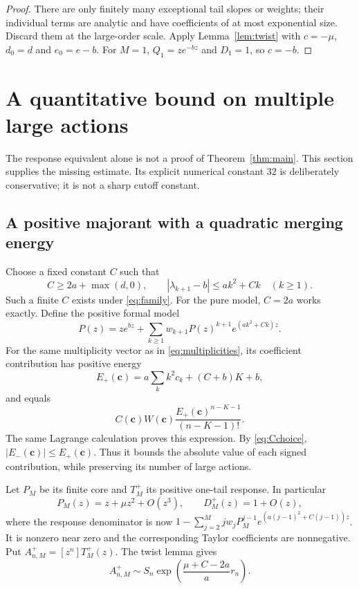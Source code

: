 \documentclass[11pt,a4paper]{article}
\numberwithin{equation}{section}
\theoremstyle{definition}
\theoremstyle{remark}
\begin{document}
\begin{proof}
There are only finitely many exceptional tail slopes or weights; their
individual terms are analytic and have coefficients of at most exponential
size. Discard them at the large-order scale. Apply
Lemma~\ref{lem:twist} with $c=-\mu$, $d_0=d$ and $e_0=e-b$.
For $M=1$, $Q_1=ze^{-bz}$ and $D_1=1$, so $c=-b$.
\end{proof}

\section{A quantitative bound on multiple large actions}
\label{sec:merging}

The response equivalent alone is not a proof of Theorem~\ref{thm:main}.
This section supplies the missing estimate. Its explicit numerical constant
$32$ is deliberately conservative; it is not a sharp cutoff constant.

\subsection{A positive majorant with a quadratic merging energy}

Choose a fixed constant $C$ such that
\begin{equation}
 C\ge 2a+\max(d,0),\qquad
 |\lambda_{k+1}-b|\le a k^2+Ck\quad(k\ge1).
 \label{eq:Cchoice}
\end{equation}
Such a finite $C$ exists under \eqref{eq:family}. For the pure model,
$C=2a$ works exactly. Define the positive formal model
\begin{equation}
 P(z)=ze^{bz}+\sum_{k\ge1}w_{k+1}P(z)^{k+1}e^{(a k^2+Ck)z}.
 \label{eq:majorant-model}
\end{equation}
For the same multiplicity vector as in \eqref{eq:multiplicities}, its
coefficient contribution has positive energy
\begin{equation}
 E_+(\mathbf c)=a\sum_k k^2c_k+(C+b)K+b,
 \label{eq:plus-energy}
\end{equation}
and equals
\begin{equation}
 C(\mathbf c)W(\mathbf c)
 \frac{E_+(\mathbf c)^{n-K-1}}{(n-K-1)!}.
 \label{eq:plus-term}
\end{equation}
The same Lagrange calculation proves this expression. By
\eqref{eq:Cchoice}, $|E_-(\mathbf c)|\le E_+(\mathbf c)$.
Thus it bounds the absolute value of each signed contribution, while
preserving its number of large actions.

Let $P_M$ be its finite core and $T_M^+$ its positive one-tail response.
In particular
\[
 P_M(z)=z+\mu z^2+O(z^3),\qquad
 D_M^+(z)=1+O(z),
\]
where the response denominator is now
$1-\sum_{j=2}^M j w_jP_M^{j-1}e^{(a(j-1)^2+C(j-1))z}$.
It is nonzero near zero and the corresponding Taylor coefficients are
nonnegative. Put $A_{n,M}^+=[z^n]T_M^+(z)$. The twist lemma gives
\begin{equation}
 A_{n,M}^+\sim
 S_n\exp\!\left(\frac{\mu+C-2a}{a}r_n\right).
 \label{eq:plus-scale}
\end{equation}
\end{document}

